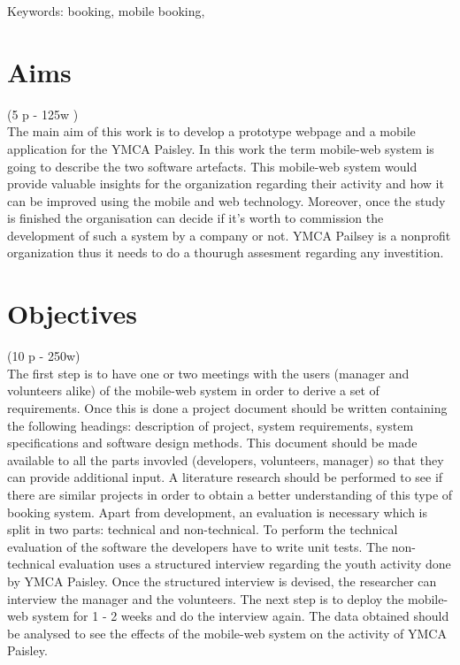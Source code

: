 \documentclass[version=last,fontsize=13pt]{scrartcl}
\begin{document}
Keywords: booking, mobile booking,

\newpage
\section{Aims}(5 p - 125w )\\
\indent
The main aim of this work is to develop a prototype webpage and a mobile application for the YMCA Paisley. In this work the term mobile-web system is going to describe the two software artefacts. This mobile-web system would provide valuable insights for the organization regarding their activity and how it can be improved using the mobile and web technology. Moreover, once the study is finished the organisation can decide if it's worth to commission the development of such a system by a company or not. 
YMCA Pailsey is a nonprofit organization thus it needs to do a thourugh assesment regarding any investition.

\section{Objectives}(10 p - 250w)\\

	The first step is to have one or two meetings with the users (manager and volunteers alike) of the mobile-web system in order to derive a  set of requirements. Once this is done a project document should be written containing the following headings: description of project, system requirements, system specifications and software design methods. This document should be made available to all the parts invovled (developers, volunteers, manager) so that they can provide additional input. A literature research should be performed to see if there are similar projects in order to obtain a better understanding of this type of booking system. Apart from development, an evaluation is necessary which is split in two parts: technical  and non-technical. To perform the technical evaluation of the software the developers have to write unit tests. The non-technical evaluation uses a structured interview regarding the youth activity done by YMCA Paisley. Once the structured interview is devised, the researcher can interview the manager and the volunteers. The next step is to deploy the mobile-web system for 1 - 2 weeks and do the interview again. The data obtained should be analysed to see the effects of the mobile-web system on the activity of YMCA Paisley.
\end{document}
